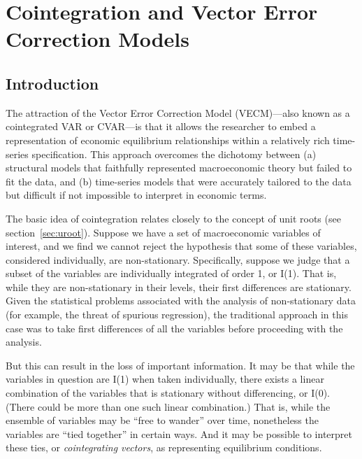 \chapter{Cointegration and Vector Error Correction Models}
\label{chap:vecm}

\section{Introduction}
\label{sec:VECM-intro}

The attraction of the Vector Error Correction Model (VECM)---also
known as a cointegrated VAR or CVAR---is that it allows the researcher
to embed a representation of economic equilibrium relationships within
a relatively rich time-series specification.  This approach overcomes
the dichotomy between (a) structural models that faithfully
represented macroeconomic theory but failed to fit the data, and (b)
time-series models that were accurately tailored to the data but
difficult if not impossible to interpret in economic terms.

The basic idea of cointegration relates closely to the concept of unit
roots (see section~\ref{sec:uroot}).  Suppose we have a set of
macroeconomic variables of interest, and we find we cannot reject the
hypothesis that some of these variables, considered individually, are
non-stationary.  Specifically, suppose we judge that a subset of the
variables are individually integrated of order 1, or I(1).  That is,
while they are non-stationary in their levels, their first differences
are stationary.  Given the statistical problems associated with the
analysis of non-stationary data (for example, the threat of spurious
regression), the traditional approach in this case was to take first
differences of all the variables before proceeding with the analysis.

But this can result in the loss of important information.  It may be
that while the variables in question are I(1) when taken individually,
there exists a linear combination of the variables that is stationary
without differencing, or I(0).  (There could be more than one such
linear combination.)  That is, while the ensemble of variables may be
``free to wander'' over time, nonetheless the variables are ``tied
together'' in certain ways.  And it may be possible to interpret these
ties, or \emph{cointegrating vectors}, as representing equilibrium
conditions.

